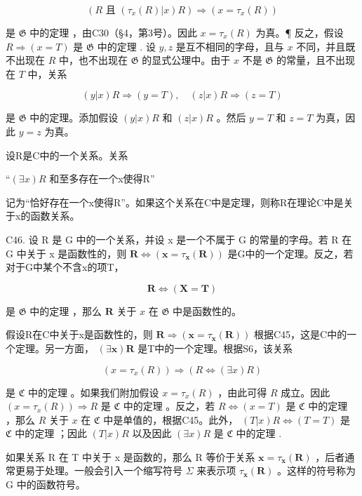 \[
(R \text {   且   } (\tau_ {x} (R) | x) R) \Longrightarrow (x = \tau_ {x} (R))
\]

是 \(\mathfrak{G}\) 中的定理 ，由C30（§4，第3号）。因此 \(x = \tau_x(R)\) 为真。¶ 反之，假设 \(R \Rightarrow (x = T)\) 是 \(\mathfrak{G}\) 中的定理 . 设 \(y, z\) 是互不相同的字母，且与 \(x\) 不同，并且既不出现在 \(R\) 中，也不出现在 \(\mathfrak{G}\) 的显式公理中。由于 \(x\) 不是 \(\mathfrak{G}\) 的常量，且不出现在 \(T\) 中，关系

\[
(y | x) R \Longrightarrow (y = T), \quad (z | x) R \Longrightarrow (z = T)
\]

是 \(\mathfrak{G}\) 中的定理。添加假设 \((y|x)R\) 和 \((z|x)R\) 。然后 \(y = T\) 和 \(z = T\) 为真，因此 \(y = z\) 为真。

设R是C中的一个关系。关系

``\((\exists x)R\) 和至多存在一个x使得R''

记为“恰好存在一个x使得R”。如果这个关系在C中是定理，则称R在理论C中是关于x的函数关系。

C46. 设 R 是 G 中的一个关系，并设 x 是一个不属于 G 的常量的字母。若 R 在 G 中关于 x 是函数性的，则 \(\mathbf{R} \Longleftrightarrow (\mathbf{x} = \tau_{\mathbf{x}}(\mathbf{R}))\) 是G中的一个定理。反之，若对于G中某个不含x的项T，

\[
\boldsymbol {R} \Longleftrightarrow (\boldsymbol {X} = \boldsymbol {T})
\]

是 \(\mathfrak{G}\) 中的定理 ，那么 \(\pmb{R}\) 关于 \(x\) 在 \(\mathfrak{G}\) 中是函数性的。

假设R在C中关于x是函数性的，则 \(\boldsymbol{R} \Longrightarrow (\boldsymbol{x} = \tau_{\boldsymbol{x}}(\boldsymbol{R}))\) 根据C45，这是C中的一个定理。另一方面， \((\exists \boldsymbol{x})\boldsymbol{R}\) 是T中的一个定理。根据S6，该关系

\[
(x = \tau_ {x} (R)) \Longrightarrow (R \Longleftrightarrow (\exists x) R)
\]

是 \(\mathfrak{C}\) 中的定理 。如果我们附加假设 \(x = \tau_x(R)\) ，由此可得 \(R\) 成立。因此 \((x = \tau_x(R)) \Longrightarrow R\) 是 \(\mathfrak{C}\) 中的定理 。反之，若 \(R \Longleftrightarrow (x = T)\) 是 \(\mathfrak{C}\) 中的定理 ，那么 \(R\) 关于 \(x\) 在 \(\mathfrak{C}\) 中是单值的，根据C45。此外， \((T|x)R \Longleftrightarrow (T = T)\) 是 \(\mathfrak{C}\) 中的定理 ；因此 \((T|x)R\) 以及因此 \((\exists x)R\) 是 \(\mathfrak{C}\) 中的定理 .

如果关系 R 在 T 中关于 x 是函数的，那么 R 等价于关系 \(\boldsymbol{x} = \tau_{\boldsymbol{x}}(\boldsymbol{R})\) ，后者通常更易于处理。一般会引入一个缩写符号 \(\Sigma\) 来表示项 \(\tau_{\boldsymbol{x}}(\boldsymbol{R})\) 。这样的符号称为 G 中的函数符号。


